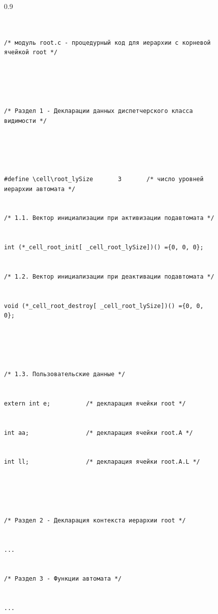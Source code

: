 \begin{figure}\scriptsize %


\begin{center}


\begin{fmpage}{0.9\textwidth}


\begin{verbatim}


/* модуль root.c - процедурный код для иерархии с корневой ячейкой root */ 





/* Раздел 1 - Декларации данных диспетчерского класса видимости */ 


 


#define \cell\root_lySize       3       /* число уровней иерархии автомата */ 


/* 1.1. Вектор инициализации при активизации подавтомата */ 


int (*_cell_root_init[ _cell_root_lySize])() ={0, 0, 0}; 


/* 1.2. Вектор инициализации при деактивации подавтомата */ 


void (*_cell_root_destroy[ _cell_root_lySize])() ={0, 0, 0}; 


 


/* 1.3. Пользовательские данные */ 


extern int e;          /* декларация ячейки root */ 


int aa;                /* декларация ячейки root.A */  


int ll;                /* декларация ячейки root.A.L */ 


 


/* Раздел 2 - Декларация контекста иерархии root */ 


... 


/* Раздел 3 - Функции автомата */ 


...


\end{verbatim}


\end{fmpage}


\end{center}


\vspace*{-6pt}






\end{figure}


